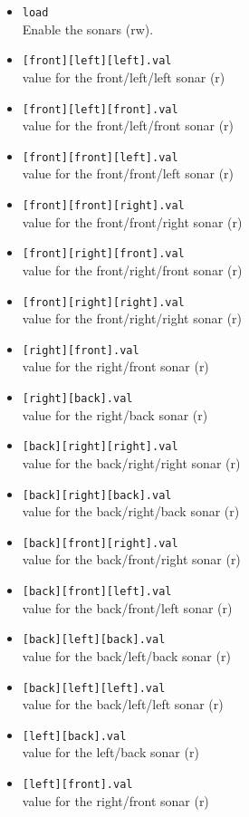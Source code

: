 \begin{itemize}
\item \lstinline|load|\\
  Enable the sonars (rw).
\item \lstinline|[front][left][left].val|\\
  value for the front/left/left sonar (r)
\item \lstinline|[front][left][front].val|\\
  value for the front/left/front sonar (r)
\item \lstinline|[front][front][left].val|\\
  value for the front/front/left sonar (r)
\item \lstinline|[front][front][right].val|\\
  value for the front/front/right sonar (r)
\item \lstinline|[front][right][front].val|\\
  value for the front/right/front sonar (r)
\item \lstinline|[front][right][right].val|\\
  value for the front/right/right sonar (r)
\item \lstinline|[right][front].val|\\
  value for the right/front sonar (r)
\item \lstinline|[right][back].val|\\
  value for the right/back sonar (r)
\item \lstinline|[back][right][right].val|\\
  value for the back/right/right sonar (r)
\item \lstinline|[back][right][back].val|\\
  value for the back/right/back sonar (r)
\item \lstinline|[back][front][right].val|\\
  value for the back/front/right sonar (r)
\item \lstinline|[back][front][left].val|\\
  value for the back/front/left sonar (r)
\item \lstinline|[back][left][back].val|\\
  value for the back/left/back sonar (r)
\item \lstinline|[back][left][left].val|\\
  value for the back/left/left sonar (r)
\item \lstinline|[left][back].val|\\
  value for the left/back sonar (r)
\item \lstinline|[left][front].val|\\
  value for the right/front sonar (r)
\end{itemize}

